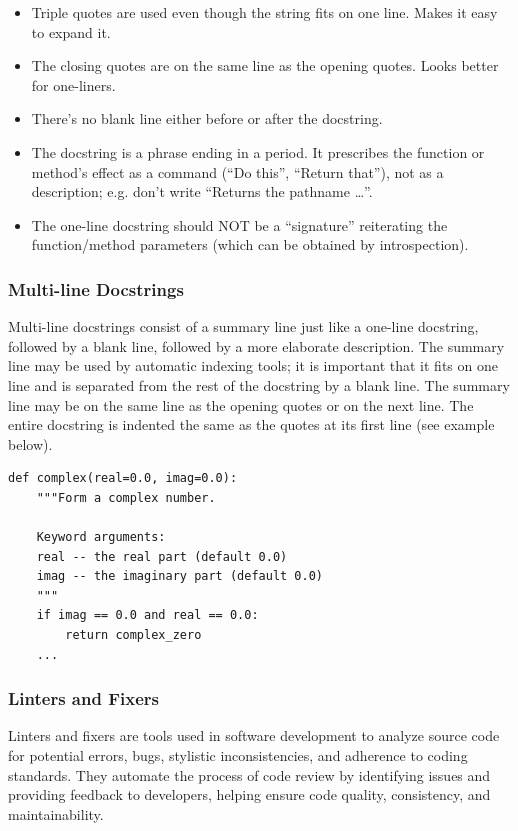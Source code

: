 \begin{itemize}
    \item Triple quotes are used even though the string fits on one line. Makes it easy to expand it.
    \item The closing quotes are on the same line as the opening quotes. Looks better for one-liners.
    \item There’s no blank line either before or after the docstring.
    \item The docstring is a phrase ending in a period. It prescribes the function or method’s effect as a command (“Do this”, “Return that”), not as a description; e.g. don’t write “Returns the pathname …”.
    \item The one-line docstring should NOT be a “signature” reiterating the function/method parameters (which can be obtained by introspection).
\end{itemize}

\newpage
\subsubsection{Multi-line Docstrings}
Multi-line docstrings consist of a summary line just like a one-line docstring, followed by a blank line, followed by a more elaborate description. The summary line may be used by automatic indexing tools; it is important that it fits on one line and is separated from the rest of the docstring by a blank line. The summary line may be on the same line as the opening quotes or on the next line. The entire docstring is indented the same as the quotes at its first line (see example below).
\begin{codebox}
\begin{verbatim}
def complex(real=0.0, imag=0.0):
    """Form a complex number.

    Keyword arguments:
    real -- the real part (default 0.0)
    imag -- the imaginary part (default 0.0)
    """
    if imag == 0.0 and real == 0.0:
        return complex_zero
    ...
\end{verbatim}
\end{codebox}

\subsubsection{Linters and Fixers}
Linters and fixers are tools used in software development to analyze source code for potential errors, bugs, stylistic inconsistencies, and adherence to coding standards. They automate the process of code review by identifying issues and providing feedback to developers, helping ensure code quality, consistency, and maintainability.\\

